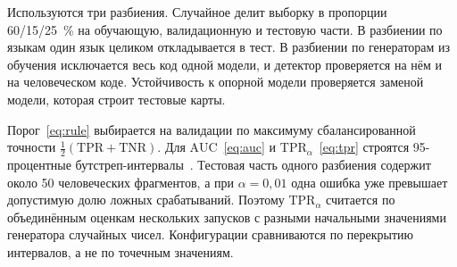 \documentclass{misisarticle}
\begin{document}
Используются три разбиения. Случайное делит выборку в пропорции 60/15/25~\% на обучающую, валидационную и тестовую части. В разбиении по языкам один язык целиком откладывается в тест. В разбиении по генераторам из обучения исключается весь код одной модели, и детектор проверяется на нём и на человеческом коде. Устойчивость к опорной модели проверяется заменой модели, которая строит тестовые карты.

Порог~\eqref{eq:rule} выбирается на валидации по максимуму сбалансированной точности $\frac{1}{2}(\mathrm{TPR} + \mathrm{TNR})$. Для $\mathrm{AUC}$~\eqref{eq:auc} и $\mathrm{TPR}_{\alpha}$~\eqref{eq:tpr} строятся 95-процентные бутстреп-интервалы~\cite{bootstrap}. Тестовая часть одного разбиения содержит около 50 человеческих фрагментов, а при $\alpha = 0{,}01$ одна ошибка уже превышает допустимую долю ложных срабатываний. Поэтому $\mathrm{TPR}_{\alpha}$ считается по объединённым оценкам нескольких запусков с разными начальными значениями генератора случайных чисел. Конфигурации сравниваются по перекрытию интервалов, а не по точечным значениям.
\end{document}
